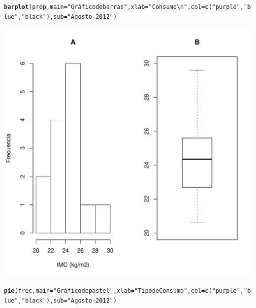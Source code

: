 \documentclass[10pt,a4paper]{article}\usepackage[]{graphicx}\usepackage[]{color}
\makeatletter
\def\maxwidth{ %
  \ifdim\Gin@nat@width>\linewidth
    \linewidth
  \else
    \Gin@nat@width
  \fi
}
\newcommand{\hlstr}[1]{\textcolor[rgb]{0.192,0.494,0.8}{#1}}%
\newcommand{\hlstd}[1]{\textcolor[rgb]{0.345,0.345,0.345}{#1}}%
\newcommand{\hlkwc}[1]{\textcolor[rgb]{0.333,0.667,0.333}{#1}}%
\newcommand{\hlkwd}[1]{\textcolor[rgb]{0.737,0.353,0.396}{\textbf{#1}}}%
\newenvironment{kframe}{%
 \def\at@end@of@kframe{}%
 \ifinner\ifhmode%
  \def\at@end@of@kframe{\end{minipage}}%
  \begin{minipage}{\columnwidth}%
 \fi\fi%
 \def\FrameCommand##1{\hskip\@totalleftmargin \hskip-\fboxsep
 \colorbox{shadecolor}{##1}\hskip-\fboxsep
     \hskip-\linewidth \hskip-\@totalleftmargin \hskip\columnwidth}%
 \MakeFramed {\advance\hsize-\width
   \@totalleftmargin\z@ \linewidth\hsize
   \@setminipage}}%
 {\par\unskip\endMakeFramed%
 \at@end@of@kframe}
\newenvironment{knitrout}{}{} %
\makeatother
\begin{document}
\begin{knitrout}
\begin{kframe}\begin{alltt}
\hlkwd{barplot}\hlstd{(prop,} \hlkwc{main}\hlstd{=}\hlstr{"Gráfico de barras"}\hlstd{,} \hlkwc{xlab}\hlstd{=}\hlstr{" Consumo\textbackslash{}n"}\hlstd{,} \hlkwc{col}\hlstd{=}\hlkwd{c}\hlstd{(}\hlstr{"purple"}\hlstd{,} \hlstr{"blue"}\hlstd{,} \hlstr{"black"}\hlstd{),} \hlkwc{sub}\hlstd{=}\hlstr{"Agosto-2012"}\hlstd{)}
\end{alltt}
\end{kframe}
\includegraphics[width=\maxwidth]{figure/unnamed-chunk-1-2} 
\begin{kframe}\begin{alltt}
\hlkwd{pie}\hlstd{(frec,} \hlkwc{main}\hlstd{=}\hlstr{"Gráfico de pastel"}\hlstd{,} \hlkwc{xlab}\hlstd{=}\hlstr{"Tipo de Consumo"}\hlstd{,} \hlkwc{col}\hlstd{=}\hlkwd{c}\hlstd{(}\hlstr{"purple"}\hlstd{,} \hlstr{"blue"}\hlstd{,} \hlstr{"black"}\hlstd{),} \hlkwc{sub}\hlstd{=}\hlstr{"Agosto-2012"}\hlstd{)}
\end{alltt}
\end{kframe}

\end{knitrout}
\end{document}
